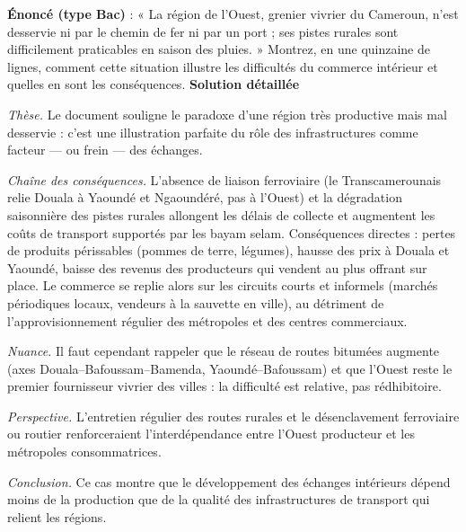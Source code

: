 \documentclass[11pt]{article}
\begin{document}
\begin{exoresolu}
\textbf{Énoncé (type Bac)} : « La région de l'Ouest, grenier vivrier du Cameroun, n'est desservie ni par le chemin de fer ni par un port ; ses pistes rurales sont difficilement praticables en saison des pluies. » Montrez, en une quinzaine de lignes, comment cette situation illustre les difficultés du commerce intérieur et quelles en sont les conséquences.
\tcblower
\textbf{Solution détaillée}

\emph{Thèse.} Le document souligne le paradoxe d'une région très productive mais mal desservie : c'est une illustration parfaite du rôle des infrastructures comme facteur — ou frein — des échanges.

\emph{Chaîne des conséquences.} L'absence de liaison ferroviaire (le Transcamerounais relie Douala à Yaoundé et Ngaoundéré, pas à l'Ouest) et la dégradation saisonnière des pistes rurales allongent les délais de collecte et augmentent les coûts de transport supportés par les bayam selam. Conséquences directes : pertes de produits périssables (pommes de terre, légumes), hausse des prix à Douala et Yaoundé, baisse des revenus des producteurs qui vendent au plus offrant sur place. Le commerce se replie alors sur les circuits courts et informels (marchés périodiques locaux, vendeurs à la sauvette en ville), au détriment de l'approvisionnement régulier des métropoles et des centres commerciaux.

\emph{Nuance.} Il faut cependant rappeler que le réseau de routes bitumées augmente (axes Douala--Bafoussam--Bamenda, Yaoundé--Bafoussam) et que l'Ouest reste le premier fournisseur vivrier des villes : la difficulté est relative, pas rédhibitoire.

\emph{Perspective.} L'entretien régulier des routes rurales et le désenclavement ferroviaire ou routier renforceraient l'interdépendance entre l'Ouest producteur et les métropoles consommatrices.

\emph{Conclusion.} Ce cas montre que le développement des échanges intérieurs dépend moins de la production que de la qualité des infrastructures de transport qui relient les régions.
\end{exoresolu}
\end{document}
